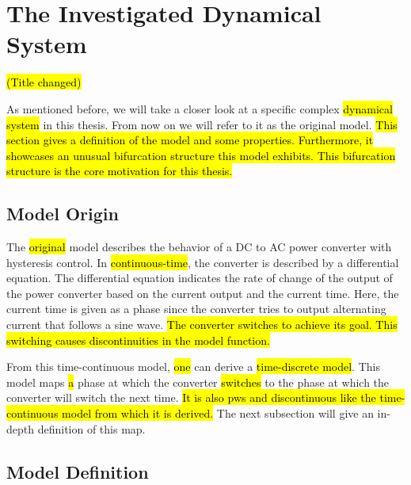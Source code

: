 \section{The Investigated Dynamical System}
\label{sec:state.og}

\hl{(Title changed)}

As mentioned before, we will take a closer look at a specific complex \hl{dynamical system} in this thesis.
From now on we will refer to it as the original model.
\hl{
	This section gives a definition of the model and some properties.
	Furthermore, it showcases an unusual bifurcation structure this model exhibits.
	This bifurcation structure is the core motivation for this thesis.
}

\subsection{Model Origin}
\label{sec:state.og.orig}

The \hl{original} model describes the behavior of a DC to AC power converter with hysteresis control.
In \hl{continuous-time}, the converter is described by a differential equation.
The differential equation indicates the rate of change of the output of the power converter based on the current output and the current time.
Here, the current time is given as a phase since the converter tries to output alternating current that follows a sine wave.
\hl{
	The converter switches to achieve its goal.
	This switching causes discontinuities in the model function.
}

From this time-continuous model, \hl{one} can derive a \hl{time-discrete model}.
This model maps \hl{a} phase at which the converter \hl{switches} to the phase at which the converter will switch the next time.
\hl{
	It is also \gls{pws} and discontinuous like the time-continuous model from which it is derived.
}
The next subsection will give an in-depth definition of this map.

\subsection{Model Definition}
\label{sec:state.og.def}


